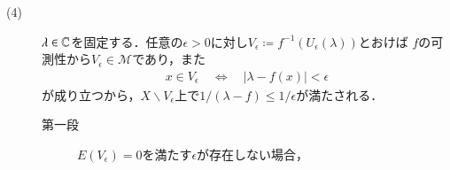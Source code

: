 \begin{prf}
\begin{description}
			\item[(4)] $\lambda \in \mathbb{C}$を固定する．任意の$\epsilon > 0$に対し$V_\epsilon \coloneqq f^{-1}(U_\epsilon(\lambda))$とおけば
				$f$の可測性から$V_\epsilon \in \mathcal{M}$であり，また
				\begin{align}
					x \in V_\epsilon \quad \Leftrightarrow \quad |\lambda - f(x)| < \epsilon
				\end{align}
				が成り立つから，$X \backslash V_\epsilon$上で$1/(\lambda - f) \leq 1/\epsilon$が満たされる．
				\begin{description}
					\item[第一段] $E(V_\epsilon) = 0$を満たす$\epsilon$が存在しない場合，
				\end{description}
				
		\end{description}
	\end{prf}